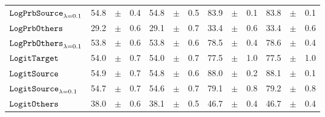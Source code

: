\documentclass[../main.tex]{subfiles}
\begin{document}
\begin{tabular}{lrrrrrrrrrrrr}
\rowcolor{lightgray}
$\mathtt{LogPrbSource}_{\lambda=0.1}$   & 54.8                            & $\pm$                                        & 0.4                        & 54.8                                                                                   & $\pm$ & 0.5                                & 83.9  & $\pm$ & 0.1             & 83.8  & $\pm$ & 0.1                           \\
$\mathtt{LogPrbOthers}_{}$              & 29.2                            & $\pm$                                        & 0.6                        & 29.1                                                                                 & $\pm$ & 0.7                                & 33.4  & $\pm$ & 0.6             & 33.4  & $\pm$ & 0.6                           \\
$\mathtt{LogPrbOthers}_{\lambda=0.1}$   & 53.8                            & $\pm$                                        & 0.6                        & 53.8                                                                                   & $\pm$ & 0.6                                & 78.5  & $\pm$ & 0.4             & 78.6  & $\pm$ & 0.4                           \\
\rowcolor{lightgray}
$\mathtt{LogitTarget}$                 & 54.0                            & $\pm$                                        & 0.7                        & 54.0                                                                                     & $\pm$ & 0.7                                & 77.5  & $\pm$ & 1.0             & 77.5  & $\pm$ & 1.0                           \\
\rowcolor{lightgray}
$\mathtt{LogitSource}_{}$               & 54.9                            & $\pm$                                        & 0.7                        & 54.8                                                                                   & $\pm$ & 0.6                                & 88.0  & $\pm$ & 0.2             & 88.1  & $\pm$ & 0.1                           \\
$\mathtt{LogitSource}_{\lambda=0.1}$    & 54.7                            & $\pm$                                        & 0.7                        & 54.6                                                                                   & $\pm$ & 0.7                                & 79.1  & $\pm$ & 0.8             & 79.2  & $\pm$ & 0.8                           \\
$\mathtt{LogitOthers}_{}$               & 38.0                            & $\pm$                                        & 0.6                        & 38.1                                                                                 & $\pm$ & 0.5                                & 46.7  & $\pm$ & 0.4             & 46.7  & $\pm$ & 0.4                           \\

\end{tabular}
\end{document}
